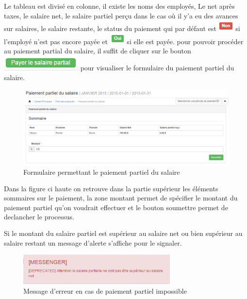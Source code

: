 \documentclass[12pt,a4paper]{report}
\begin{document}
Le tableau est divisé en colonne, il existe les noms des employés, Le net après taxes, le salaire net, le salaire partiel perçu dans le cas où il y'a eu des avances sur salaires, le salaire restante, le status du paiement qui par défaut est \includegraphics[scale=0.7]{pic/NonTaxes.png} si l'employé n'est pas encore payée et \includegraphics[scale=0.7]{pic/OuiTaxes.png} si elle est payée. pour pouvoir procéder au paiement partial du salaire, il suffit de cliquer sur le bouton  \includegraphics[scale=0.7]{pic/salaryPartial.png} pour visualiser le formulaire du paiement partiel du salaire.

\begin{figure}[h]
\begin{center}
\includegraphics[width=14cm]{pic/FormPartPaiement.png}
\end{center}
\caption{Formulaire permettant le paiement partiel du salaire}
\label{Formulaire permettant le paiement partiel du salaire}
\end{figure}

Dans la figure ci haute on retrouve dans la partie supérieur les éléments sommaires sur le paiement, la zone montant permet de spécifier le montant du paiement partiel qu'on voudrait effectuer et le bouton soumettre permet de declancher le processus.

Si le montant du salaire partiel est supérieur au salaire net ou bien supérieur au salaire restant un message d'alerte s'affiche pour le signaler.

\begin{figure}[h]
\begin{center}
\includegraphics[width=8cm]{pic/errorPartialPaiement.png}
\end{center}
\caption{Message d'erreur en cas de paiement partiel impossible}
\label{Message d'erreur en cas de paiement partiel impossible}
\end{figure}
\end{document}

